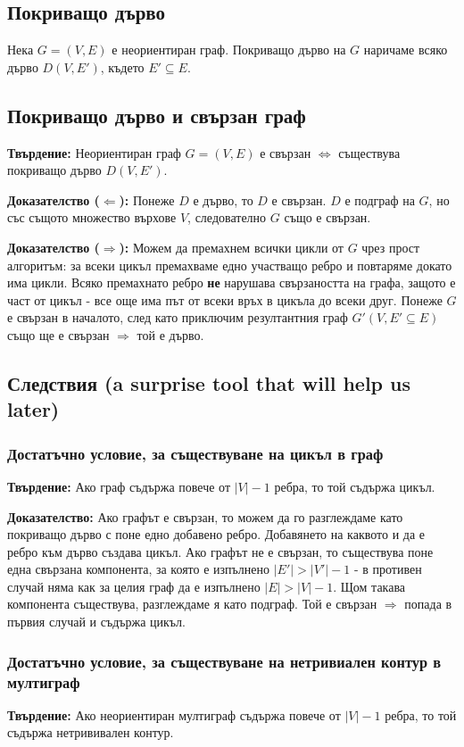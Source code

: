 \documentclass[fleqn,12pt]{article}
\begin{document}
\subsection{Покриващо дърво}
Нека $G = (V, E)$ е неориентиран граф. Покриващо дърво на $G$ наричаме всяко дърво $D(V, E')$, където $E' \subseteq E$.

\subsection{Покриващо дърво и свързан граф} 

\textbf{Твърдение:} Неориентиран граф $G = (V, E)$ е свързан $\Leftrightarrow$ съществува покриващо дърво $D(V, E')$.

\textbf{Доказателство ($\Leftarrow$):} Понеже $D$ е дърво, то $D$ е свързан. $D$ е подграф на $G$, но със същото множество върхове $V$, следователно $G$ също е свързан.

\textbf{Доказателство ($\Rightarrow$):} Можем да премахнем всички цикли от $G$ чрез прост алгоритъм: за всеки цикъл премахваме едно участващо ребро
и повтаряме докато има цикли. Всяко премахнато ребро \textbf{не} нарушава свързаността на графа, защото е част от цикъл - все още има 
път от всеки връх в цикъла до всеки друг.
Понеже $G$ е свързан в началото, след като приключим резултантния граф $G'(V, E' \subseteq E)$ също ще е свързан $\Rightarrow$ той е дърво.

\subsection{Следствия (a surprise tool that will help us later)}
\subsubsection{Достатъчно условие, за съществуване на цикъл в граф}
\textbf{Твърдение: } Ако граф съдържа повече от $|V| - 1$ ребра, то той съдържа цикъл.

\textbf{Доказателство: } Ако графът е свързан, то можем да го разглеждаме като покриващо дърво с поне едно добавено ребро.
Добавянето на каквото и да е ребро към дърво създава цикъл. Ако графът не е свързан, то съществува поне една свързана компонента,
за която е изпълнено $|E'| > |V'| - 1$ - в противен случай няма как за целия граф да е изпълнено $|E| > |V| - 1$.
Щом такава компонента съществува, разглеждаме я като подграф. Той е свързан $\Rightarrow$ попада в първия случай и съдържа цикъл.

\subsubsection{Достатъчно условие, за съществуване на нетривиален контур в мултиграф}
\textbf{Твърдение: } Ако неориентиран мултиграф съдържа повече от $|V| - 1$ ребра, то той съдържа нетрививален контур.
\end{document}

